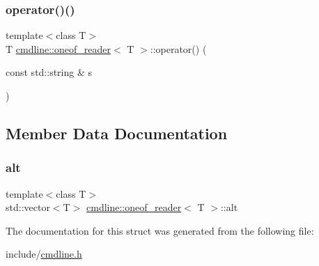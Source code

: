 \mbox{\label{structcmdline_1_1oneof__reader_a08342ad57fe7eae76ccdbe6af6cc572f}} 
\subsubsection{\texorpdfstring{operator()()}{operator()()}}
{\footnotesize\ttfamily template$<$class T$>$ \\
T \mbox{\hyperlink{structcmdline_1_1oneof__reader}{cmdline\+::oneof\+\_\+reader}}$<$ T $>$\+::operator() (\begin{DoxyParamCaption}\item[{const std\+::string \&}]{s }\end{DoxyParamCaption})\hspace{0.3cm}{\ttfamily [inline]}}



\subsection{Member Data Documentation}
\mbox{\label{structcmdline_1_1oneof__reader_a78106c3bc54537d6ae591d0b04eab7a5}} 
\subsubsection{\texorpdfstring{alt}{alt}}
{\footnotesize\ttfamily template$<$class T$>$ \\
std\+::vector$<$T$>$ \mbox{\hyperlink{structcmdline_1_1oneof__reader}{cmdline\+::oneof\+\_\+reader}}$<$ T $>$\+::alt\hspace{0.3cm}{\ttfamily [private]}}



The documentation for this struct was generated from the following file\+:\begin{DoxyCompactItemize}
\item 
include/\mbox{\hyperlink{cmdline_8h}{cmdline.\+h}}\end{DoxyCompactItemize}
